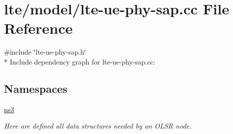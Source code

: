 \hypertarget{lte-ue-phy-sap_8cc}{}\section{lte/model/lte-\/ue-\/phy-\/sap.cc File Reference}
\label{lte-ue-phy-sap_8cc}
{\ttfamily \#include \char`\"{}lte-\/ue-\/phy-\/sap.\+h\char`\"{}}\\*
Include dependency graph for lte-\/ue-\/phy-\/sap.cc\+:
\subsection*{Namespaces}
\begin{DoxyCompactItemize}
\item 
 \hyperlink{namespacens3}{ns3}
\begin{DoxyCompactList}\small\item\em Here are defined all data structures needed by an O\+L\+SR node. \end{DoxyCompactList}\end{DoxyCompactItemize}
